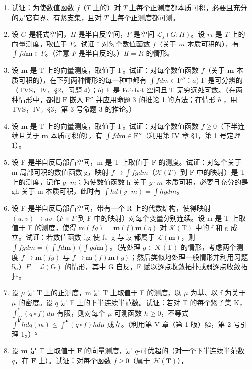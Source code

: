 \begin{enumerate}
\def\labelenumi{\arabic{enumi})}
\item
  试证：为使数值函数 \(f\)（\(T\) 上的）对 \(T\) 上每个正测度都本质可积，必要且充分的是它有界、有紧支集，且对 \(T\) 上每个正测度都可测。
\item
  设 \(G\) 是桶式空间，\(H\) 是半自反空间，\(F\) 是空间 \(\mathcal{L}_s(G;H)\)。设 \(m\) 是 \(T\) 上的向量测度，取值于 \(F\)。试证：对每个数值函数 \(f\)（关于 \(m\) 本质可积的），有 \(\int fd\mathbf{m} \in F\)。（注意 \(F\) 是半自反的。）\(H = R\) 的情形。
\item
  设 \(\mathbf{m}\) 是 \(\mathrm{T}\) 上的向量测度，取值于 \(\mathrm{F}\)。试证：对每个数值函数 \(f\)（关于 \(\mathbf{m}\) 本质可积的），在下列两种情形的每一种中都有 \(\int f dm \in \mathrm{F}''\)：\(a)\) \(\mathrm{F}\) 是可分辨的（TVS，IV，§2，习题 4）；\(b)\) \(\mathrm{F}\) 是 Fréchet 空间且 \(\mathrm{T}\) 无穷远处可数。（在两种情形中，都把 \(\mathrm{F}\) 嵌入 \(\mathrm{F}''\) 并应用命题 3 的推论 1 的方法；在情形 \(b\) ，用 TVS，IV，§3，第 3 号命题 3 的推论。）
\item
  设 \(\mathbf{m}\) 是 \(\mathrm{T}\) 上的向量测度，取值于 \(\mathrm{F}\)。试证：对每个数值函数 \(f \geqslant 0\)（下半连续且关于 \(\mathbf{m}\) 本质可积的），有 \(\int f d\mathbf{m} \in \mathrm{F}''\)（利用第 IV 章 §1，第 1 号定理 1）。
\item
  设 F 是半自反局部凸空间，m 是 T 上取值于 F 的测度。试证：对每个关于 m 局部可积的数值函数 g，映射 \(f \mapsto \int fg dm\)（\(\mathcal{K}(T)\) 到 F 中的映射）是 T 上的测度，记作 \(g \cdot m\)；为使数值函数 h 关于 \(g \cdot m\) 本质可积，必要且充分的是 gh 关于 m 本质可积，此时有 \(\int h d(g \cdot m) = \int hg dm\)。
\item
  设 F 是半自反局部凸空间，带有一个 R 上的代数结构，使得映射 \((u,v)\mapsto uv\)（\(F\times F\) 到 F 中的映射）对每个变量分别连续。设 m 是 T 上取值于 F 的测度，使得 \(\mathbf{m}(fg)=\mathbf{m}(f)\mathbf{m}(g)\) 对 \(\mathcal{K}(\mathrm{T})\) 中的 f 和 g 成立。试证：若数值函数 f,g 使 f、g 与 fg 都属于 \(\mathcal{L}(\mathbf{m})\)，则 \(\int fg dm=(\int fd\mathbf{m})(\int gd\mathbf{m})\)。（先处理 \(g\in\mathcal{K}(\mathrm{T})\) 的情形，考虑两个测度 \(f\mapsto\mathbf{m}(fg)\) 与 \(f\mapsto\mathbf{m}(f)\mathbf{m}(g)\)；然后类似地处理一般情形并利用习题 5。）\(F=\mathcal{L}(\mathrm{G})\) 的情形，其中 G 自反，F 赋以逐点收敛拓扑或弱逐点收敛拓扑。
\item
  设 \(\mu\) 是 T 上的正测度，m 是 T 上取值于 F 的测度，以 \(\mu\) 为基、以 f 为关于 \(\mu\) 的密度。设 \(q\) 是 F 上的下半连续半范数。试证：若对 T 的每个紧子集 K，\(\int_{K}^{*}(q \circ f) d\mu\) 有限，则对每个 \(\mu\)-可测函数 \(h \geqslant 0\)，不等式 \(\int^{\bullet} h dq(m) \leqslant \int^{\bullet} (q \circ f) h d\mu\) 成立。（利用第 V 章（第 1 版）§2，第 2 号引理 1。）²
\item
  设 \(\mathbf{m}\) 是 \(\mathbf{T}\) 上取值于 \(\mathbf{F}\) 的向量测度，是 \(q\)-可优超的（对一个下半连续半范数 \(q\)，在 \(\mathbf{F}\) 上）。试证：对每个函数 \(f \geqslant 0\)（属于 \(\mathcal{H}(\mathbf{T})\)），
\end{enumerate}


